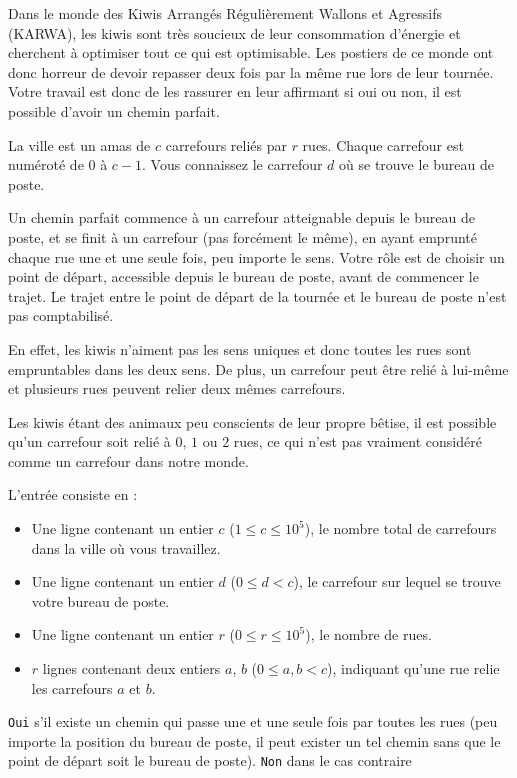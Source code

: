 \problemname{}


Dans le monde des Kiwis Arrangés Régulièrement Wallons et Agressifs (KARWA), les kiwis sont très soucieux de leur consommation d'énergie et cherchent à optimiser tout ce qui est optimisable. Les postiers de ce monde ont donc horreur de devoir repasser deux fois par la même rue lors de leur tournée. Votre travail est donc de les rassurer en leur affirmant si oui ou non, il est possible d'avoir un chemin parfait.

La ville est un amas de $c$ carrefours reliés par $r$ rues. Chaque carrefour est numéroté de $0$ à $c-1$. Vous connaissez le carrefour $d$ où se trouve le bureau de poste.

Un chemin parfait commence à un carrefour atteignable depuis le bureau de poste, et se finit à un carrefour (pas forcément le même), en ayant emprunté chaque rue une et une seule fois, peu importe le sens. Votre rôle est de choisir un point de départ, accessible depuis le bureau de poste, avant de commencer le trajet. Le trajet entre le point de départ de la tournée et le bureau de poste n'est pas comptabilisé.

En effet, les kiwis n'aiment pas les sens uniques et donc toutes les rues sont empruntables dans les deux sens. De plus, un carrefour peut être relié à lui-même et plusieurs rues peuvent relier deux mêmes carrefours.

Les kiwis étant des animaux peu conscients de leur propre bêtise, il est possible qu'un carrefour soit relié à $0$, $1$ ou $2$ rues, ce qui n'est pas vraiment considéré comme un carrefour dans notre monde.

\begin{Input}
    L'entrée consiste en :
    \begin{itemize}
        \item Une ligne contenant un entier $c$ ($1 \leq c \leq 10^5$), le nombre total de carrefours dans la ville où vous travaillez.
        \item Une ligne contenant un entier $d$ ($0 \leq d < c$), le carrefour sur lequel se trouve votre bureau de poste.
        \item Une ligne contenant un entier $r$ ($0 \leq r \leq 10^5$), le nombre de rues.
        \item $r$ lignes contenant deux entiers $a$, $b$ ($0 \leq a,b < c$), indiquant qu'une rue relie les carrefours $a$ et $b$.
    \end{itemize}
\end{Input}

\begin{Output}
    \texttt{Oui} s'il existe un chemin qui passe une et une seule fois par toutes les rues (peu importe la position du bureau de poste, il peut exister un tel chemin sans que le point de départ soit le bureau de poste). \texttt{Non} dans le cas contraire
\end{Output}
